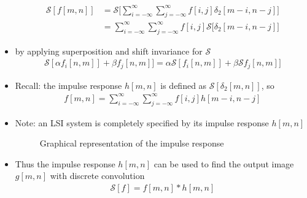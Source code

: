 \documentclass[letterpaper,12pt]{article}
\begin{document}
\begin{itemize}
\begin{align}
        \mathcal{S}[f[m,n]] & = \mathcal{S}\bigg[ \sum\limits_{i = -\infty}^{\infty}\sum\limits_{j = -\infty}^{\infty} f[i, j] \delta_2[m - i, n - j]  \bigg] \\
                            & = \sum\limits_{i = -\infty}^{\infty}\sum\limits_{j = -\infty}^{\infty} f[i, j] \mathcal{S} \bigg[ \delta_2[m - i, n - j] \bigg]
       \end{align}
 \item by applying superposition and shift invariance for $\mathcal{S}$
       \begin{align}
        \mathcal{S}[\alpha f_i[n, m]] + \beta f_j[n, m]] = \alpha\mathcal{S}[f_i[n, m]] + \beta\mathcal{S}f_j[n, m]]
       \end{align}
 \item Recall: the impulse response $h[m,n]$ is defined as $\mathcal{S}[\delta_2[m,n]]$, so
       \begin{align}
        f[m,n] = \sum\limits_{i = -\infty}^{\infty}\sum\limits_{j = -\infty}^{\infty} f[i, j] h[m-i,n-j]
       \end{align}
 \item Note: an LSI system is completely specified by its impulse response $h[m,n]$
       \begin{figure}[H]
        \begin{center}
        \end{center}
        \caption{Graphical representation of the impulse response}
       \end{figure}
 \item Thus the impulse response $h[m,n]$ can be used to find the output image $g[m,n]$ with discrete convolution
       \begin{align}
        \mathcal{S}[f] = f[m,n] * h[m,n]
       \end{align}
\end{itemize}
\end{document}

